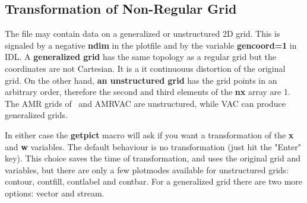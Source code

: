 \subsection{Transformation of Non-Regular Grid \label{s-transform}}

   The file may contain data on a generalized or unstructured 2D grid.
   This is signaled by a negative {\bf ndim} in the plotfile 
   and by the variable {\bf gencoord=1} in IDL.
   A {\bf generalized grid} has the same topology as a regular grid
   but the coordinates are not Cartesian. It is a {it continuouus}
   distortion of the original grid. On the other hand, 
   {\bf an unstructured grid} has the grid points in an arbitrary
   order, therefore the second and third elements of the 
   {\bf nx} array are 1. The AMR grids of \BATSRUS\ and AMRVAC are
   unstructured, while VAC can produce generalized grids.

   In either case the {\bf getpict} macro will ask if you want a
   transformation of the {\bf x} and {\bf w} variables.
   The default behaviour is no transformation (just hit the "Enter" key).
   This choice saves the time of transformation, and uses the original grid 
   and variables, but there are only a few plotmodes available for 
   unstructured grids: contour, contfill, contlabel and contbar.
   For a generalized grid there are two more options: vector and stream.

